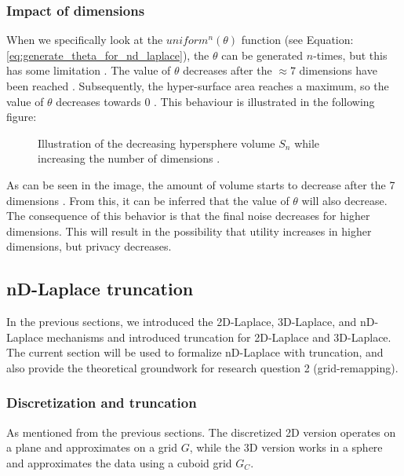 \subsubsection{Impact of dimensions} \label{theory:privacy-utility-nd}
When we specifically look at the \(uniform^n(\theta)\) function (see Equation: \ref{eq:generate_theta_for_nd_laplace}), the \(\theta\) can be generated \(n\)-times, but this has some limitation \citep{weisstein_hypersphere_nodate}.
The value of \(\theta\) decreases after the $\approx 7$ dimensions have been reached \citep{wells_penguin_1997}. Subsequently, the hyper-surface area reaches a maximum, so the value of $\theta$ decreases towards 0 \citep{weisstein_hypersphere_nodate}.
This behaviour is illustrated in the following figure:
\begin{figure}[H]
\centering
  
  \caption{Illustration of the decreasing hypersphere volume $S_n$ while increasing the number of dimensions \citep{weisstein_hypersphere_nodate}.}
  \label{fig:curse-of-dimensionality}
\end{figure}
As can be seen in the image, the amount of volume starts to decrease after the 7 dimensions . From this, it can be inferred that the value of  $\theta$ will also decrease. 
The consequence of this behavior is that the final noise decreases for higher dimensions. This will result in the possibility that utility increases in higher dimensions, but privacy decreases.
\newpage
\subsection{nD-Laplace truncation \label{section-grid-remapping}}
In the previous sections, we introduced the 2D-Laplace, 3D-Laplace, and nD-Laplace mechanisms and introduced truncation for 2D-Laplace and 3D-Laplace.
The current section will be used to formalize nD-Laplace with truncation, and also provide the theoretical groundwork for research question 2 (grid-remapping).

\subsubsection{Discretization and truncation} \label{theory:nd-laplace-truncation}
As mentioned from the previous sections. The discretized 2D version operates on a plane and approximates on a grid $G$, while the 3D version works in a sphere and approximates the data using a cuboid grid  $G_C$.


